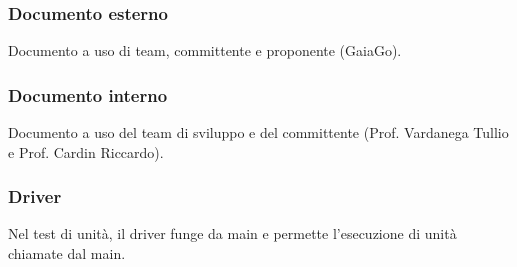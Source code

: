 \subsubsection*{Documento esterno}
Documento a uso di team, committente e proponente (GaiaGo).

\subsubsection*{Documento interno}
Documento a uso del team di sviluppo e del committente (Prof. Vardanega Tullio e Prof. Cardin Riccardo).

\subsubsection*{Driver}
Nel test di unità, il driver funge da main e permette l'esecuzione di unità chiamate dal main.

